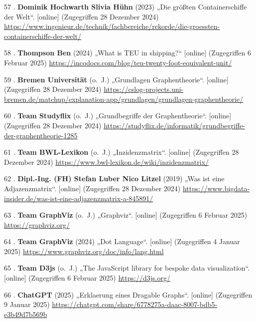 \documentclass[
    headings=optiontotocandhead,%
    twoside,
    numbers=noenddot,%
    12pt, %
    titlepage, %
    parskip=full, %
    listof=leveldown, 
    numbers=noenddot, %
    a4paper,DIV=14,
    BCOR=15mm,
]{scrbook}
\newlength{\cslhangindent}
\newenvironment{cslreferences}%
  {\setlength{\parindent}{0pt}%
  \everypar{\setlength{\hangindent}{\cslhangindent}}\ignorespaces}%
  {\par}
\begin{document}
\begin{cslreferences}
\leavevmode\hypertarget{ref-IngenieurDE-Containershiffe}{}%
57 . \textbf{Dominik Hochwarth Slivia Hühn} (2023) „Die größten
Containerschiffe der Welt``. {[}online{]} (Zugegriffen 28 Dezember 2024)
\url{https://www.ingenieur.de/technik/fachbereiche/rekorde/die-groessten-containerschiffe-der-welt/}

\leavevmode\hypertarget{ref-IncoDocs-TEU}{}%
58 . \textbf{Thompson Ben} (2024) „What is TEU in shipping?{}``
{[}online{]} (Zugegriffen 6 Februar 2025)
\url{https://incodocs.com/blog/teu-twenty-foot-equivalent-unit/}

\leavevmode\hypertarget{ref-Uni-Bremen-Graphentheorie}{}%
59 . \textbf{Bremen Universität} (o.~J.) „Grundlagen Graphentheorie``.
{[}online{]} (Zugegriffen 28 Dezember 2024)
\url{https://cslog-projects.uni-bremen.de/matchup/explanation-app/grundlagen/grundlagen-graphentheorie/}

\leavevmode\hypertarget{ref-Studyflix-Graphentheorie}{}%
60 . \textbf{Team Studyflix} (o.~J.) „Grundbegriffe der
Graphentheorie``. {[}online{]} (Zugegriffen 28 Dezember 2024)
\url{https://studyflix.de/informatik/grundbegriffe-der-graphentheorie-1285}

\leavevmode\hypertarget{ref-BWL-Lexikon-Inzidenzmatrix}{}%
61 . \textbf{Team BWL-Lexikon} (o.~J.) „Inzidenzmatrix``. {[}online{]}
(Zugegriffen 28 Dezember 2024)
\url{https://www.bwl-lexikon.de/wiki/inzidenzmatrix/}

\leavevmode\hypertarget{ref-BigDataInsider}{}%
62 . \textbf{Dipl.-Ing. (FH) Stefan Luber Nico Litzel} (2019) „Was ist
eine Adjazenzmatrix``. {[}online{]} (Zugegriffen 28 Dezember 2024)
\url{https://www.bigdata-insider.de/was-ist-eine-adjazenzmatrix-a-845891/}

\leavevmode\hypertarget{ref-Graphviz-Homepage}{}%
63 . \textbf{Team GraphViz} (o.~J.) „Graphviz``. {[}online{]}
(Zugegriffen 6 Februar 2025) \url{https://graphviz.org/}

\leavevmode\hypertarget{ref-GraphViz-Documentation}{}%
64 . \textbf{Team GraphViz} (2024) „Dot Language``. {[}online{]}
(Zugegriffen 4 Januar 2025)
\url{https://www.graphviz.org/doc/info/lang.html}

\leavevmode\hypertarget{ref-D3js-Homepage}{}%
65 . \textbf{Team D3js} (o.~J.) „The JavaScript library for bespoke data
visualization``. {[}online{]} (Zugegriffen 6 Februar 2025)
\url{https://d3js.org/}

\leavevmode\hypertarget{ref-gpt-DragableGraph}{}%
66 . \textbf{ChatGPT} (2025) „Erklaerung eines Dragable Graphs``.
{[}online{]} (Zugegriffen 9 Januar 2025)
\url{https://chatgpt.com/share/6778275a-daac-8007-bdb5-e3b49d7b569b}


\end{cslreferences}
\end{document}
